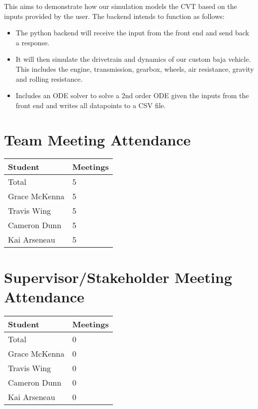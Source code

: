 \documentclass{article}
\begin{document}
This aims to demonstrate how our simulation models the CVT based on the inputs provided by the user. The backend intends to function as follows:
\begin{itemize}
  \item The python backend will receive the input from the front end and send back a response.
  \item It will then simulate the drivetrain and dynamics of our custom baja vehicle. This includes the engine, transmission, gearbox, wheels, air resistance, gravity and rolling resistance.
  \item Includes an ODE solver to solve a 2nd order ODE given the inputs from the front end and writes all datapoints to a CSV file.
\end{itemize}

\section{Team Meeting Attendance}



\begin{table}[H]
\centering
\begin{tabular}{ll}
\toprule
\textbf{Student} & \textbf{Meetings}\\
\midrule
Total & 5\\
Grace McKenna & 5\\
Travis Wing & 5\\
Cameron Dunn & 5\\
Kai Arseneau & 5\\
\bottomrule
\end{tabular}
\end{table}


\section{Supervisor/Stakeholder Meeting Attendance}

\begin{table}[H]
\centering
\begin{tabular}{ll}
\toprule
\textbf{Student} & \textbf{Meetings}\\
\midrule
Total & 0\\
Grace McKenna & 0\\
Travis Wing & 0\\
Cameron Dunn & 0\\
Kai Arseneau & 0\\
\bottomrule
\end{tabular}
\end{table}
\end{document}
